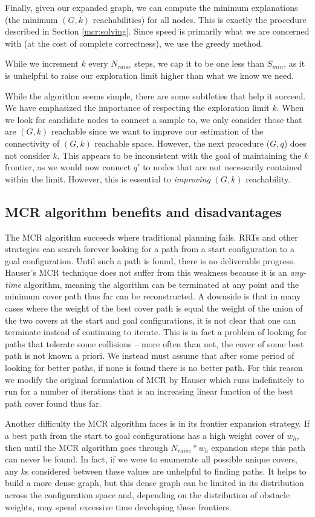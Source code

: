 Finally, given our expanded graph, we can compute the minimum explanations (the minimum $(G,k)$ reachabilities) for all nodes. This is exactly the procedure described in Section \ref{mcr:solving}. Since speed is primarily what we are concerned with (at the cost of complete correctness), we use the greedy method.

While we increment $k$ every $N_{raise}$ steps, we cap it to be one less than $S_{min}$, as it is unhelpful to raise our exploration limit higher than what we know we need. 

While the algorithm seems simple, there are some subtleties that help it succeed. We have emphasized the importance of respecting the exploration limit $k$. When we look for candidate nodes to connect a sample to, we only consider those that are $(G,k)$ reachable since we want to improve our estimation of the connectivity of $(G,k)$ reachable space. However, the next procedure ($G,q$) does not consider $k$. This appears to be inconsistent with the goal of maintaining the $k$ frontier, as we would now connect $q'$ to nodes that are not necessarily contained within the limit. However, this is essential to \emph{improving} $(G,k)$ reachability.

\subsection{MCR algorithm benefits and disadvantages}
The MCR algorithm succeeds where traditional planning fails. RRTs and other strategies can search forever looking for a path from a start configuration to a goal configuration. Until such a path is found, there is no deliverable progress. Hauser's MCR technique does not suffer from this weakness because it is an \emph{any-time} algorithm, meaning the algorithm can be terminated at any point and the minimum cover path thus far can be reconstructed. A downside is that in many cases where the weight of the best cover path is equal the weight of the union of the two covers at the start and goal configurations, it is not clear that one can terminate instead of continuing to iterate. This is in fact a problem of looking for paths that tolerate some collisions -- more often than not, the cover of some best path is not known a priori. We instead must assume that after some period of looking for better paths, if none is found there is no better path. For this reason we modify the original formulation of MCR by Hauser which runs indefinitely to run for a number of iterations that is an increasing linear function of the best path cover found thus far.

Another difficulty the MCR algorithm faces is in its frontier expansion strategy. If a best path from the start to goal configurations has a high weight cover of $w_h$, then until the MCR algorithm goes through $N_{raise} * w_h$ expansion steps this path can never be found. In fact, if we were to enumerate all possible unique covers, any $k$s considered between these values are unhelpful to finding paths. It helps to build a more dense graph, but this dense graph can be limited in its distribution across the configuration space and, depending on the distribution of obstacle weights, may spend excessive time developing these frontiers.

